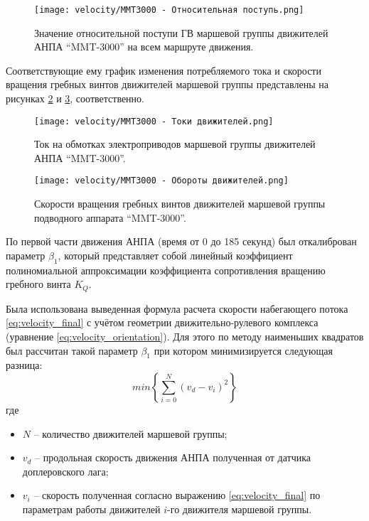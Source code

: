 \begin{figure}[ht]
    \centering
    \texttt{[image: velocity/MMT3000 - Относительная поступь.png]}
    \caption{Значение относительной поступи ГВ маршевой группы движителей АНПА ``MMT-3000'' на всем маршруте движения.}
    \label{fig:advance_ratio}
\end{figure}


Соответствующие ему график изменения потребляемого тока и скорости вращения гребных винтов движителей маршевой группы представлены на рисунках \ref{fig:mmt3000_curent} и \ref{fig:mmt3000_rotation}, соответственно.

\begin{figure}[ht]
    \centering
    \texttt{[image: velocity/MMT3000 - Токи движителей.png]}
    \caption{Ток на обмотках электроприводов маршевой группы движителей АНПА ``MMT-3000''.}
    \label{fig:mmt3000_curent}
\end{figure}

\begin{figure}[ht]
    \centering
    \texttt{[image: velocity/MMT3000 - Обороты движителей.png]}
    \caption{Скорости вращения гребных винтов движителей маршевой группы подводного аппарата ``MMT-3000''.}
    \label{fig:mmt3000_rotation}
\end{figure}

По первой части движения АНПА (время от 0 до 185 секунд) был откалиброван параметр $\beta_1$, который представляет собой линейный коэффициент полиномиальной аппроксимации коэффициента сопротивления вращению гребного винта $K_Q$. 

Была использована выведенная формула расчета скорости набегающего потока \ref{eq:velocity_final} с учётом геометрии движительно-рулевого комплекса (уравнение \ref{eq:velocity_orientation}).
Для этого по методу наименьших квадратов был рассчитан такой параметр $\beta_1$ при котором минимизируется следующая разница:
\begin{equation}
    \label{eq:b1_search}
    min\left\{ \sum_{i=0}^N\left( v_d - v_i \right)^2 \right\}
\end{equation}
\noindent где
\begin{itemize}
    \item $N$ -- количество движителей маршевой группы;
    \item $v_d$ -- продольная скорость движения АНПА полученная от датчика доплеровского лага;
    \item $v_i$ -- скорость полученная согласно выражению \ref{eq:velocity_final} по параметрам работы движителей $i$-го движителя маршевой группы.
\end{itemize}

